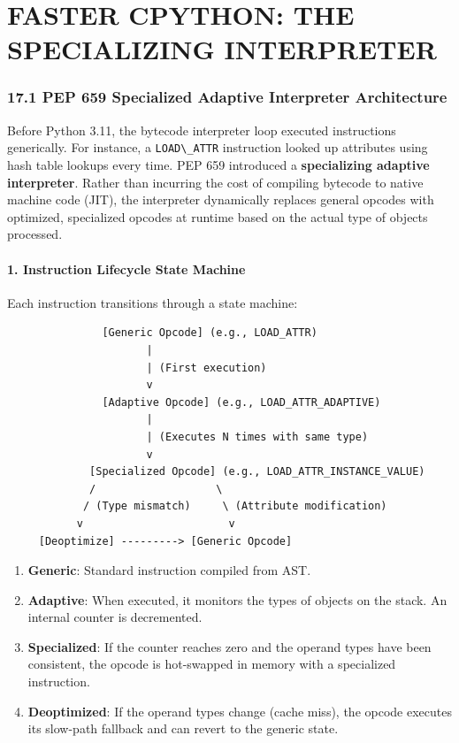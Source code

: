 \hypertarget{faster-cpython-the-specializing-interpreter}{%
\chapter{FASTER CPYTHON: THE SPECIALIZING
INTERPRETER}\label{faster-cpython-the-specializing-interpreter}}

\hypertarget{pep-659-specialized-adaptive-interpreter-architecture}{%
\subsection{17.1 PEP 659 Specialized Adaptive Interpreter
Architecture}\label{pep-659-specialized-adaptive-interpreter-architecture}}

Before Python 3.11, the bytecode interpreter loop executed instructions
generically. For instance, a \passthrough{\lstinline!LOAD\_ATTR!}
instruction looked up attributes using hash table lookups every time.
PEP 659 introduced a \textbf{specializing adaptive interpreter}. Rather
than incurring the cost of compiling bytecode to native machine code
(JIT), the interpreter dynamically replaces general opcodes with
optimized, specialized opcodes at runtime based on the actual type of
objects processed.

\hypertarget{instruction-lifecycle-state-machine}{%
\subsubsection{1. Instruction Lifecycle State
Machine}\label{instruction-lifecycle-state-machine}}

Each instruction transitions through a state machine:

\begin{lstlisting}
               [Generic Opcode] (e.g., LOAD_ATTR)
                      |
                      | (First execution)
                      v
               [Adaptive Opcode] (e.g., LOAD_ATTR_ADAPTIVE)
                      |
                      | (Executes N times with same type)
                      v
             [Specialized Opcode] (e.g., LOAD_ATTR_INSTANCE_VALUE)
             /                   \
            / (Type mismatch)     \ (Attribute modification)
           v                       v
     [Deoptimize] ---------> [Generic Opcode]
\end{lstlisting}

\begin{enumerate}
\def\labelenumi{\arabic{enumi}.}
\tightlist
\item
  \textbf{Generic}: Standard instruction compiled from AST.
\item
  \textbf{Adaptive}: When executed, it monitors the types of objects on
  the stack. An internal counter is decremented.
\item
  \textbf{Specialized}: If the counter reaches zero and the operand
  types have been consistent, the opcode is hot-swapped in memory with a
  specialized instruction.
\item
  \textbf{Deoptimized}: If the operand types change (cache miss), the
  opcode executes its slow-path fallback and can revert to the generic
  state.
\end{enumerate}

